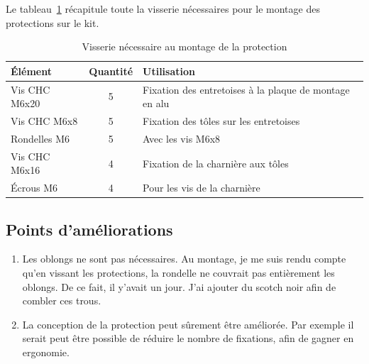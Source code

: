 \begin{minipage}{\textwidth}
    Le tableau~\ref{tab:visserie_protection} récapitule toute la visserie nécessaires pour le montage des protections sur le kit.
    \begin{table}[H]
        \centering
        \renewcommand{\arraystretch}{1.3}
        \begin{tabular}{|l|c|l|}
            \hline
            \textbf{Élément} & \textbf{Quantité} & \textbf{Utilisation}                                   \\
            \hline
            Vis CHC M6x20    & 5                 & Fixation des entretoises à la plaque de montage en alu \\
            Vis CHC M6x8     & 5                 & Fixation des tôles sur les entretoises                 \\
            Rondelles M6     & 5                 & Avec les vis M6x8                                      \\
            Vis CHC M6x16    & 4                 & Fixation de la charnière aux tôles                     \\
            Écrous M6        & 4                 & Pour les vis de la charnière                           \\
            \hline
        \end{tabular}
        \caption{Visserie nécessaire au montage de la protection}
        \label{tab:visserie_protection}
    \end{table}
\end{minipage}
\subsection{Points d'améliorations}
\begin{enumerate}
    \item Les oblongs ne sont pas nécessaires. Au montage, je me suis rendu compte qu'en vissant les protections, la rondelle ne couvrait pas entièrement les oblongs. De ce fait, il y'avait un jour. J'ai ajouter du scotch noir afin de combler ces trous.
    \item La conception de la protection peut sûrement être améliorée. Par exemple il serait peut être possible de réduire le nombre de fixations, afin de gagner en ergonomie.
\end{enumerate}
\clearpage